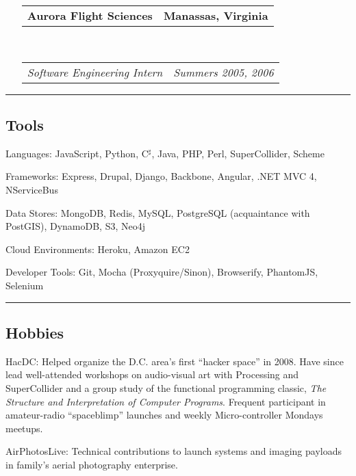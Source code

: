 \documentclass[10pt,letterpaper]{article}
\makeatletter
\newenvironment{indentsection}[1]%
{\begin{list}{}%
	{\setlength{\leftmargin}{#1}}%
	\item[]%
}
{\end{list}}
\newcommand{\headerrow}[2]
{\begin{tabular*}{\linewidth}{l@{\extracolsep{\fill}}r}
	#1 &
	#2 \\
\end{tabular*}}
\makeatother
\begin{document}
\begin{itemize}
	\item[]
	\headerrow
		{\textbf{Aurora Flight Sciences}}
		{\textbf{Manassas, Virginia}}
	\\
	\headerrow
		{\emph{Software Engineering Intern}}
		{\emph{Summers 2005, 2006}}

\end{itemize}

\begin{center}
\hrule
\subsection*{Tools}
\end{center}

\begin{indentsection}{\parindent}
\begin{description*}
	\item[Languages:]
		JavaScript, Python, C$^\sharp$, Java, PHP, Perl, SuperCollider, Scheme
	\item[Frameworks:] Express, Drupal, Django, Backbone, Angular, .NET MVC 4, NServiceBus
	\item[Data Stores:] MongoDB, Redis, MySQL, PostgreSQL (acquaintance with PostGIS), DynamoDB, S3, Neo4j
	\item[Cloud Environments:] Heroku, Amazon EC2
	\item[Developer Tools:] Git, Mocha (Proxyquire/Sinon), Browserify, PhantomJS, Selenium
\end{description*}
\end{indentsection}

\begin{center}
\hrule
\vspace{-0.4em}
\subsection*{Hobbies}
\end{center}

\begin{indentsection}{\parindent}
\begin{description*}
	\item[HacDC:]
	Helped organize the D.C. area's first ``hacker space'' in 2008. Have since lead well-attended workshops on audio-visual art with Processing and SuperCollider and a group study of the functional programming classic, {\emph{The Structure and Interpretation of Computer Programs}}. Frequent participant in amateur-radio ``spaceblimp'' launches and weekly Micro-controller Mondays meetups.
	\item[AirPhotosLive:]
	Technical contributions to launch systems and imaging payloads in family's aerial photography enterprise.
\end{description*}
\end{indentsection}
\end{document}
